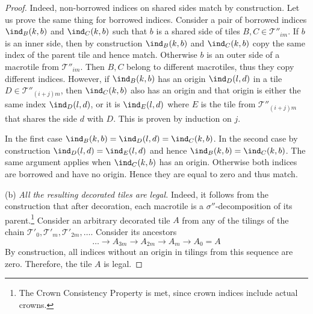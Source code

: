 \documentclass[12pt]{article}
\theoremstyle{remark}
\begin{document}
\begin{proof}
Indeed, non-borrowed indices on shared sides match by construction. Let us prove the same thing for borrowed indices.
Consider a pair of  borrowed indices $\ind_B(k,b)$ and  $\ind_C(k,b)$
such that $b$ is a shared side of tiles $B,C\in  \mathcal T''_{im}$.
If $b$ is an inner side, then by construction $\ind_B(k,b)$ and  $\ind_C(k,b)$ copy the same index
of the parent tile and hence match.
Otherwise $b$ is an outer side of a macrotile from $\mathcal T''_{im}$.
Then $B,C$ belong to different macrotiles, thus they copy different indices.
However, if  $\ind_B(k,b)$ has an origin $\ind_D(l,d)$ in a tile $D\in \mathcal T''_{(i+j)m}$,
then $\ind_C(k,b)$ also has an origin and that origin is either the same 
index $\ind_D(l,d)$, or it is 
$\ind_E(l,d)$ where
$E$ is the tile from $\mathcal T''_{(i+j)m}$ that shares the side $d$ with $D$.
This is proven by induction on $j$.

In the first case $\ind_B(k,b)=\ind_D(l,d)=\ind_C(k,b)$. In the second case
by construction $\ind_D(l,d)=\ind_E(l,d)$ and hence $\ind_B(k,b)=\ind_C(k,b)$.
The same argument applies when  $\ind_C(k,b)$ has an origin. Otherwise 
both  indices are borrowed and have no origin. Hence they  are equal to zero
and thus match.
 
  (b) \emph{All the resulting decorated tiles are legal.} Indeed, it follows from the construction that after decoration,
  each macrotile is a $\sigma''$-decomposition of its parent.\footnote{The Crown Consistency Property
  is met, since crown indices include actual crowns.} Consider an arbitrary decorated tile $A$ from any of the tilings of the chain
  $\mathcal T'_0, \mathcal T'_{m},\mathcal T'_{2m},\dots$.
  Consider its ancestors
  $$
  \dots\to A_{3m}\to A_{2m}\to A_m\to A_0=A
  $$
  By construction, all indices without an origin in tilings from this sequence are zero. Therefore, the tile $A$ is legal.
\end{proof}
\end{document}
